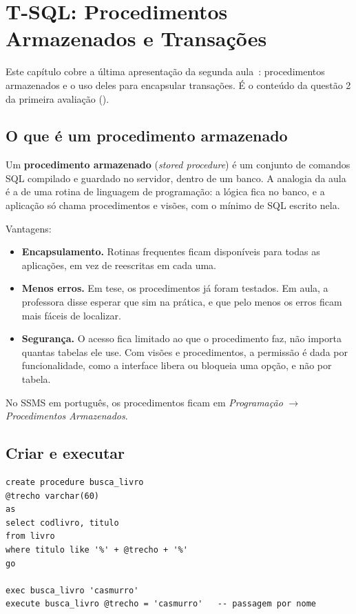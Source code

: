 \setchapterpreamble[u]{\margintoc}
\chapter{T-SQL: Procedimentos Armazenados e Transações}

Este capítulo cobre a última apresentação da segunda
aula~\cite{BaiocoCET615}: procedimentos armazenados e o uso deles
para encapsular transações. É o conteúdo da questão 2 da primeira
avaliação ().

\section{O que é um procedimento armazenado}

Um \textbf{procedimento armazenado}
(\emph{stored procedure}) é um conjunto de comandos SQL compilado e
guardado no servidor, dentro de um banco. A analogia da aula é a de uma
rotina de linguagem de programação: a lógica fica no banco, e a
aplicação só chama procedimentos e visões, com o mínimo de SQL escrito
nela.

Vantagens:

\begin{itemize}
	\item \textbf{Encapsulamento.} Rotinas frequentes ficam disponíveis
	para todas as aplicações, em vez de reescritas em cada uma.
	\item \textbf{Menos erros.} Em tese, os procedimentos já foram
	testados. Em aula, a professora disse esperar que sim na prática, e
	que pelo menos os erros ficam mais fáceis de localizar.
	\item \textbf{Segurança.} O acesso fica limitado ao que o
	procedimento faz, não importa quantas tabelas ele use. Com visões e
	procedimentos, a permissão é dada por funcionalidade, como a interface
	libera ou bloqueia uma opção, e não por tabela.
\end{itemize}

No SSMS em português, os procedimentos ficam em \emph{Programação}
$\rightarrow$ \emph{Procedimentos Armazenados}.

\section{Criar e executar}

\begin{lstlisting}[caption={Busca de livros por parte do título.}]
create procedure busca_livro
@trecho varchar(60)
as
select codlivro, titulo
from livro
where titulo like '%' + @trecho + '%'
go

exec busca_livro 'casmurro'
execute busca_livro @trecho = 'casmurro'   -- passagem por nome
\end{lstlisting}

